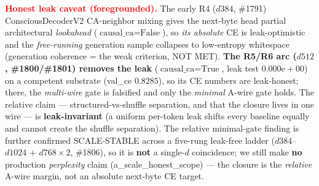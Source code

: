 \documentclass[11pt]{article}
\begin{document}
\textbf{\textcolor{red}{Honest leak caveat (foregrounded).}} The early R4 ($d384$, \#1791)
ConsciousDecoderV2 CA-neighbor mixing gives the next-byte head partial architectural
\emph{lookahead} ($\text{causal\_ca}{=}\text{False}$), so \emph{its absolute} CE is
leak-optimistic and the \emph{free-running} generation sample collapses to low-entropy
whitespace (generation coherence = the weak criterion, NOT MET). \textbf{The R5/R6 arc
($d512$, \#1800/\#1801) removes the leak} ($\text{causal\_ca}{=}\text{True}$, leak test
$0.000\mathrm{e}{+}00$) on a competent substrate (val\_ce $0.8285$), so its CE numbers are
leak-honest; there, the \emph{multi-wire} gate is falsified and only the \emph{minimal} A-wire
gate holds. The relative claim --- structured-vs-shuffle separation, and that the closure lives
in one wire --- is \textbf{leak-invariant} (a uniform per-token leak shifts every baseline
equally and cannot create the shuffle separation). The relative minimal-gate finding is further
confirmed SCALE-STABLE across a five-rung leak-free ladder ($d384$--$d1024$ $+$ $d768{\times}2$,
\#1806), so it is \textbf{not} a single-$d$ coincidence; we still make \textbf{no} production
\emph{perplexity} claim (a\_scale\_honest\_scope) --- the closure is the \emph{relative} A-wire
margin, not an absolute next-byte CE target.
\end{document}

